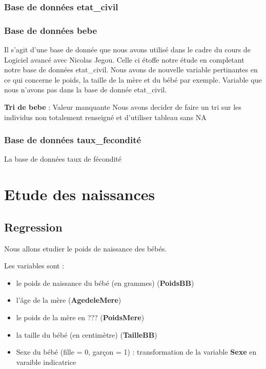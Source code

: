 \documentclass[
]{article}
\begin{document}
\hypertarget{base-de-donnuxe9es-etat_civil}{%
\subsubsection{Base de données
etat\_civil}\label{base-de-donnuxe9es-etat_civil}}

\hypertarget{base-de-donnuxe9es-bebe}{%
\subsubsection{Base de données bebe}\label{base-de-donnuxe9es-bebe}}

Il s'agit d'une base de donnée que nous avons utilisé dans le cadre du
cours de Logiciel avancé avec Nicolas Jegou. Celle ci étoffe notre étude
en completant notre base de données etat\_civil. Nous avons de nouvelle
variable pertinantes en ce qui concerne le poids, la taille de la mère
et du bébé par exemple. Variable que nous n'avons pas dans la base de
donnée etat\_civil.

\textbf{Tri de bebe} : Valeur manquante Nous avons decider de faire un
tri sur les individus non totalement renseigné et d'utiliser tableau
sans NA

\hypertarget{base-de-donnuxe9es-taux_fecondituxe9}{%
\subsubsection{Base de données
taux\_fecondité}\label{base-de-donnuxe9es-taux_fecondituxe9}}

La base de données taux de fécondité

\hypertarget{etude-des-naissances}{%
\section{Etude des naissances}\label{etude-des-naissances}}

\hypertarget{regression}{%
\subsection{Regression}\label{regression}}

Nous allons etudier le poids de naissance des bébés.

Les variables sont :

\begin{itemize}
\item
  le poids de naissance du bébé (en grammes) (\textbf{PoidsBB})
\item
  l'âge de la mère (\textbf{AgedeleMere})
\item
  le poids de la mère en ??? (\textbf{PoidsMere})
\item
  la taille du bébé (en centimètre) (\textbf{TailleBB})
\item
  Sexe du bébé (fille = 0, garçon = 1) : transformation de la variable
  \textbf{Sexe} en varaible indicatrice
\end{itemize}
\end{document}

